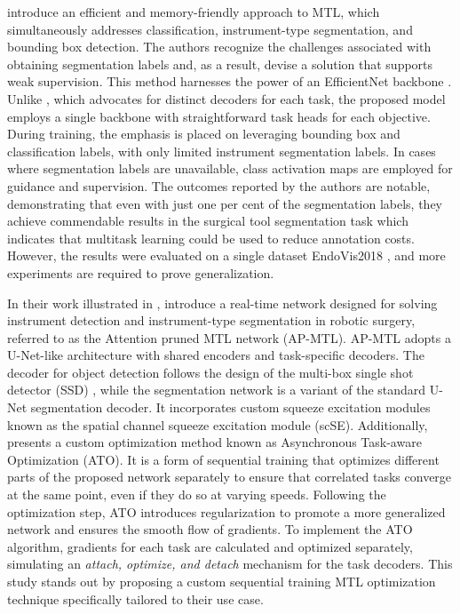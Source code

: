 \citet{scalable_joint_detection} introduce an efficient and memory-friendly approach to MTL, which simultaneously addresses classification, instrument-type segmentation, and bounding box detection. The authors recognize the challenges associated with obtaining segmentation labels and, as a result, devise a solution that supports weak supervision.
This method harnesses the power of an EfficientNet backbone \citep{koonce2021efficientnet}. Unlike \citet{simultaneous_depth_tool_seg}, which advocates for distinct decoders for each task, the proposed model employs a single backbone with straightforward task heads for each objective. During training, the emphasis is placed on leveraging bounding box and classification labels, with only limited instrument segmentation labels. In cases where segmentation labels are unavailable, class activation maps are employed for guidance and supervision.
The outcomes reported by the authors are notable, demonstrating that even with just one per cent of the segmentation labels, they achieve commendable results in the surgical tool segmentation task which indicates that multitask learning could be used to reduce annotation costs. However, the results were evaluated on a single dataset EndoVis2018 \citep{endovis2018}, and more experiments are required to prove generalization. 


In their work illustrated in , \citet{islam2020apmtl} introduce a real-time network designed for solving instrument detection and instrument-type segmentation in robotic surgery, referred to as the Attention pruned MTL network (AP-MTL). AP-MTL adopts a U-Net-like architecture with shared encoders and task-specific decoders. The decoder for object detection follows the design of the multi-box single shot detector (SSD) \citep{ssd_multibox}, while the segmentation network is a variant of the standard U-Net segmentation decoder. It incorporates custom squeeze excitation modules \citep{squeeze_excitation} known as the spatial channel squeeze excitation module (scSE). 
Additionally, \citet{islam2020apmtl} presents a custom optimization method known as Asynchronous Task-aware Optimization (ATO). It is a form of sequential training that optimizes different parts of the proposed network separately to ensure that correlated tasks converge at the same point, even if they do so at varying speeds. Following the optimization step, ATO introduces regularization to promote a more generalized network and ensures the smooth flow of gradients. To implement the ATO algorithm, gradients for each task are calculated and optimized separately, simulating an \emph{attach, optimize, and detach} mechanism for the task decoders. 
This study stands out by proposing a custom sequential training MTL optimization technique specifically tailored to their use case.


